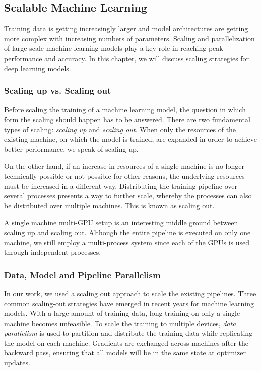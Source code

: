 \subsection{Scalable Machine Learning}

Training data is getting increasingly larger and model architectures are getting more complex with increasing numbers 
of parameters. Scaling and parallelization of large-scale machine learning models play a key role in reaching peak 
performance and accuracy. In this chapter, we will discuss scaling strategies for deep learning models. 

\subsubsection{Scaling up vs. Scaling out}

Before scaling the training of a machine learning model, the question in which form the scaling should happen has to 
be answered. There are two fundamental types of scaling: \textit{scaling up} and \textit{scaling out}. When only the resources of the 
existing machine, on which the model is trained, are expanded in order to achieve better performance, we speak of 
scaling up.

On the other hand, if an increase in resources of a single machine is no longer technically possible or not possible for 
other reasons, the underlying resources must be increased in a different way. Distributing the training pipeline over 
several processes presents a way to further scale, whereby the processes can also be distributed over multiple machines. 
This is known as scaling out. 

A single machine multi-GPU setup is an interesting middle ground between scaling up and scaling out. Although the entire 
pipeline is executed on only one machine, we still employ a multi-process system since each of the GPUs is used through 
independent processes.

\subsubsection{Data, Model and Pipeline Parallelism}
\label{subsubsec:data-model-pipeline}

In our work, we used a scaling out approach to scale the existing pipelines. Three common scaling-out strategies have emerged 
in recent years for machine learning models. With a large amount of training data, long training on only a single 
machine becomes unfeasible. To scale the training to multiple devices, \textit{data parallelism} is used to partition and distribute 
the training data while replicating the model on each machine. Gradients are exchanged across machines after the backward 
pass, ensuring that all models will be in the same state at optimizer updates. 

